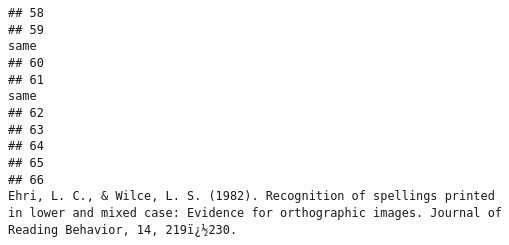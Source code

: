 \documentclass[
  english,
  man]{apa6}
\begin{document}
\begin{verbatim}
## 58                                                                                                                                                                                                                                                                                                                     
## 59                                                                                                                                                                                                                                                                                                                 same
## 60                                                                                                                                                                                                                                                                                                                     
## 61                                                                                                                                                                                                                                                                                                                 same
## 62                                                                                                                                                                                                                                                                                                                     
## 63                                                                                                                                                                                                                                                                                                                     
## 64                                                                                                                                                                                                                                                                                                                     
## 65                                                                                                                                                                                                                                                                                                                     
## 66                                                                                                                                          Ehri, L. C., & Wilce, L. S. (1982). Recognition of spellings printed in lower and mixed case: Evidence for orthographic images. Journal of Reading Behavior, 14, 219ï¿½230.

\end{verbatim}
\end{document}
